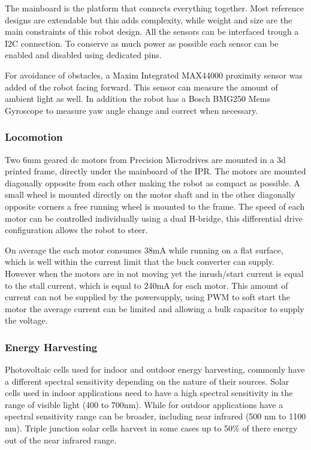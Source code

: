 \documentclass[letterpaper, 10 pt, conference]{ieeeconf}  %
\begin{document}
The mainboard is the platform that connects everything together.
Most reference designs are extendable but this adds complexity, while weight and size are the main constraints of this robot design.
All the sensors can be interfaced trough a I2C connection.
To conserve as much power as possible each sensor can be enabled and disabled using dedicated pins.

For avoidance of obstacles, a Maxim Integrated MAX44000 proximity sensor was added of the robot facing forward.
This sensor can measure the amount of ambient light as well.
In addition the robot has a Bosch BMG250 Mems Gyroscope to measure yaw angle change and correct when necessary.

\subsubsection{Locomotion}

Two 6mm geared dc motors from Precision Microdrives are mounted in a 3d printed frame, directly under the mainboard of the IPR.
The motors are mounted diagonally opposite from each other making the robot as compact as possible.
A small wheel is mounted directly on the motor shaft and in the other diagonally opposite corners a free running wheel is mounted to the frame.
The speed of each motor can be controlled individually using a dual H-bridge, this differential drive configuration allows the robot to steer.

On average the each motor consumes 38mA while running on a flat surface, which is well within the current limit that the buck converter can supply.
However when the motors are in not moving yet the inrush/start current is equal to the stall current, which is equal to 240mA for each motor.
This amount of current can not be supplied by the powersupply, using PWM to soft start the motor the average current can be limited and allowing a bulk capacitor to supply the voltage.

\subsubsection{Energy Harvesting}


Photovoltaic cells used for indoor and outdoor energy harvesting, commonly have a different spectral sensitivity depending on the nature of their sources.
Solar cells used in indoor applications need to have a high spectral sensitivity in the range of visible light (400 to 700nm).
While for outdoor applications have a spectral sensitivity range can be broader, including near infrared  (500 nm to 1100 nm).
Triple junction solar cells harvest in some cases up to 50\% of there energy out of the near infrared range.
\end{document}
